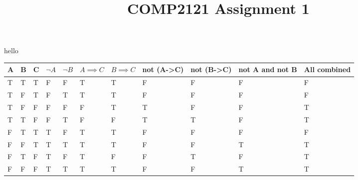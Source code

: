 \documentclass{article}
\title{COMP2121 Assignment 1}
\begin{document}
\maketitle

hello
\begin{table}[]
\begin{tabular}{|l|l|l|l|l|l|l|l|l|l|l|}
\hline
A & B & C & $\neg A$ & $\neg B$ & $A \implies C$ & $B \implies C$ & not (A-\textgreater{}C) & not (B-\textgreater{}C) & not A and not B & All combined \\ \hline
T & T & T & F & F & T & T & F & F & F & F \\ \hline
T & F & T & F & T & T & T & F & F & F & F \\ \hline
T & F & F & F & F & F & T & T & F & F & T \\ \hline
T & T & F & F & T & F & F & T & T & F & T \\ \hline
F & T & T & T & F & T & T & F & F & F & F \\ \hline
F & F & T & T & T & T & T & F & F & T & T \\ \hline
F & T & F & T & F & T & F & F & T & F & T \\ \hline
F & F & F & T & T & T & T & F & F & T & T \\ \hline
\end{tabular}
\end{table}
\end{document}
